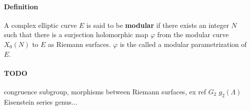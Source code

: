 \documentclass[letterpaper,10pt]{article}
\begin{document}
\paragraph{Definition} A complex elliptic curve $E$ is said to be \textbf{modular} if there exists an integer $N$ such that there is a surjection holomorphic map $\varphi$ 
from the modular curve $X_0(N)$ to $E$ as Riemann surfaces. $\varphi$ is the called a modular parametrization of $E$.

\paragraph{TODO} congruence subgroup,  morphisms between Riemann surfaces,
ex ref \cite{zhou} $G_2$ $g_2(\Lambda)$ Eisenstein series genus...


\printbibliography %
\end{document}
